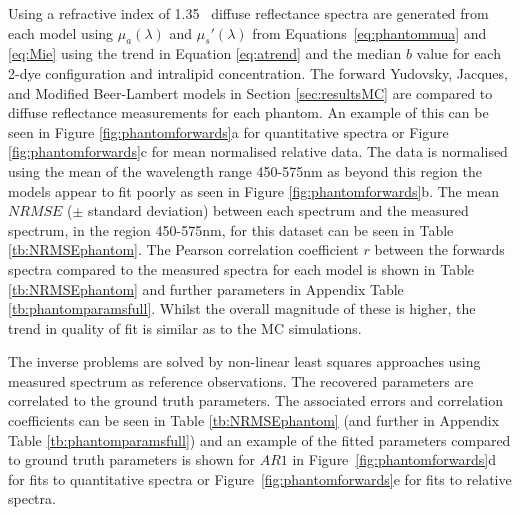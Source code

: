 Using a refractive index of 1.35~\citep{Pogue2006} diffuse reflectance spectra are generated from each model using $\mu_a(\lambda)$ and $\mu_s'(\lambda)$ from Equations~\eqref{eq:phantommua} and \eqref{eq:Mie} using the trend in Equation \eqref{eq:atrend} and the median $b$ value for each 2-dye configuration and intralipid concentration. The forward Yudovsky, Jacques, and Modified Beer-Lambert models in Section \ref{sec:resultsMC} are compared to diffuse reflectance measurements for each phantom.
An example of this can be seen in Figure \ref{fig:phantomforwards}a for quantitative spectra or Figure \ref{fig:phantomforwards}c for mean normalised relative data.
The data is normalised using the mean of the wavelength range 450-575nm as beyond this region the models appear to fit poorly as seen in Figure \ref{fig:phantomforwards}b. 
The mean $NRMSE$ ($\pm$ standard deviation) between each spectrum and the measured spectrum, in the region 450-575nm, for this dataset can be seen in Table \ref{tb:NRMSEphantom}. 
The Pearson correlation coefficient $r$ between the forwards spectra compared to the measured spectra for each model is shown in Table \ref{tb:NRMSEphantom} and further parameters in Appendix Table \ref{tb:phantomparamsfull}. Whilst the overall magnitude of these is higher, the trend in quality of fit is similar as to the MC simulations. 

The inverse problems are solved by non-linear least squares  approaches using measured spectrum as reference observations. The recovered parameters are correlated to the ground truth parameters. The associated errors and correlation coefficients can be seen in Table \ref{tb:NRMSEphantom} (and further in Appendix Table \ref{tb:phantomparamsfull}) and an example of the fitted parameters compared to ground truth parameters is shown for $AR1$ in Figure~\ref{fig:phantomforwards}d for fits to quantitative spectra or Figure~\ref{fig:phantomforwards}e for fits to 
relative spectra.

